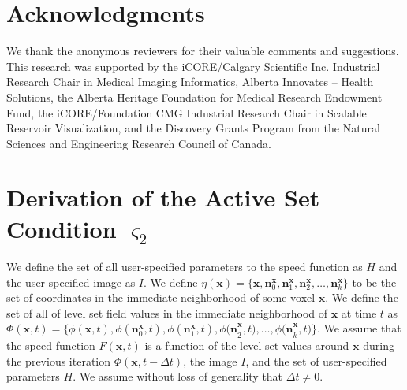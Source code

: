\documentclass{egpubl}
\begin{document}
{{%

\section*{Acknowledgments}
We thank the anonymous reviewers for their valuable comments and suggestions. This research was supported by the iCORE/Calgary Scientific Inc. Industrial Research Chair in Medical Imaging Informatics, Alberta Innovates -- Health Solutions, the Alberta Heritage Foundation for Medical Research Endowment Fund, the iCORE/Foundation CMG Industrial Research Chair in Scalable Reservoir Visualization, and the Discovery Grants Program from the Natural Sciences and Engineering Research Council of Canada.









\appendix
\section{Derivation of the Active Set Condition $\varsigma_{2}$}
\label{app:1}

We define the set of all user-specified parameters to the speed function as $H$ and the user-specified image as $I$. We define $\eta \left({\mathbf x}\right)=\{{\mathbf x},{{\mathbf n}}^{{\mathbf x}}_0,{{\mathbf n}}^{{\mathbf x}}_1,{{\mathbf n}}^{{\mathbf x}}_2,\ldots ,{{\mathbf n}}^{{\mathbf x}}_k\}$ to be the set of coordinates in the immediate neighborhood of some voxel ${\mathbf x}$. We define the set of all of level set field values in the immediate neighborhood of ${\mathbf x}$ at time $t$ as $\Phi \left({\mathbf x},t\right)=\{\phi\left({\mathbf x},t\right),\phi\left({{\mathbf n}}^{{\mathbf x}}_0,t\right),\phi\left({{\mathbf n}}^{{\mathbf x}}_1,t\right),{\phi({\mathbf n}}^{{\mathbf x}}_2,t),\ldots ,{\phi({\mathbf n}}^{{\mathbf x}}_k,t)\}$. We assume that the speed function $F({\mathbf x},t)$ is a function of the level set values around ${\mathbf x}$ during the previous iteration $\Phi \left({\mathbf x},t-\Delta t\right)$, the image $I$, and the set of user-specified parameters $H$. We assume without loss of generality that $\Delta t\ne 0$.

}}
\end{document}
